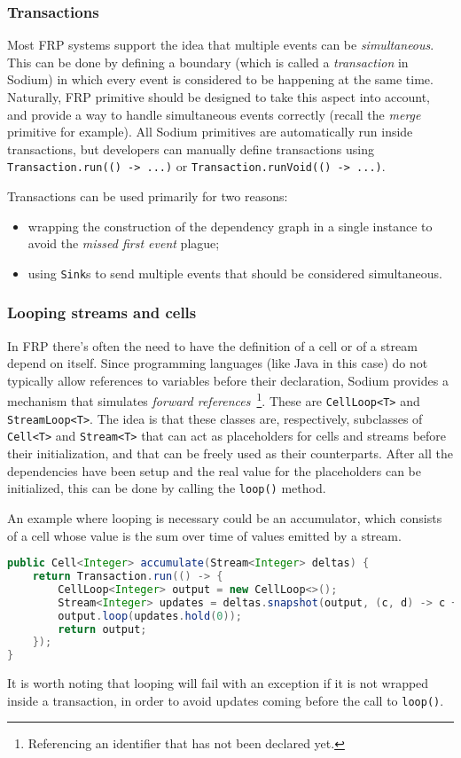 \subsubsection{Transactions}
\label{sec:transactions}

Most FRP systems support the idea that multiple events can be \textit{simultaneous}.
%
This can be done by defining a boundary (which is called a \textit{transaction} in Sodium) in which every event is considered to be happening at the same time.
%
Naturally, FRP primitive should be designed to take this aspect into account, and provide a way to handle simultaneous events correctly (recall the \textit{merge} primitive for example).
%
All Sodium primitives are automatically run inside transactions, but developers can manually define transactions using \texttt{Transaction.run(() -> ...)} or \texttt{Transaction.runVoid(() -> ...)}.

Transactions can be used primarily for two reasons:
%
\begin{itemize}
    \item wrapping the construction of the dependency graph in a single instance to avoid the \textit{missed first event} plague;
    \item using \texttt{Sink}s to send multiple events that should be considered simultaneous.
\end{itemize}

\subsubsection{Looping streams and cells}

In FRP there's often the need to have the definition of a cell or of a stream depend on itself.
%
Since programming languages (like Java in this case) do not typically allow references to variables before their declaration, Sodium provides a mechanism that simulates \textit{forward references}~\footnote{Referencing an identifier that has not been declared yet.}.
%
These are \texttt{CellLoop<T>} and \texttt{StreamLoop<T>}.
%
The idea is that these classes are, respectively, subclasses of \texttt{Cell<T>} and \texttt{Stream<T>} that can act as placeholders for cells and streams before their initialization, and that can be freely used as their counterparts.
%
After all the dependencies have been setup and the real value for the placeholders can be initialized, this can be done by calling the \texttt{loop()} method.

An example where looping is necessary could be an accumulator, which consists of a cell whose value is the sum over time of values emitted by a stream.
%
\begin{lstlisting}[frame=single, language=java]
public Cell<Integer> accumulate(Stream<Integer> deltas) {
    return Transaction.run(() -> {
        CellLoop<Integer> output = new CellLoop<>();
        Stream<Integer> updates = deltas.snapshot(output, (c, d) -> c + d);
        output.loop(updates.hold(0));
        return output;
    });
}
\end{lstlisting}
%
It is worth noting that looping will fail with an exception if it is not wrapped inside a transaction, in order to avoid updates coming before the call to \texttt{loop()}.
